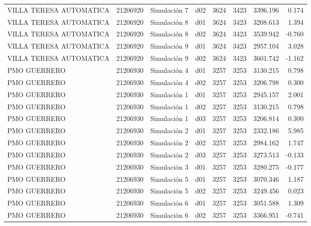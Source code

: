 \begin{landscape}
\begin{longtable}{lrlp{2cm}p{2cm}p{3cm}p{2cm}r}
 VILLA TERESA AUTOMATICA &  21206920 &   Simulación 7 &   d02 &      3624 &     3423 &  3396.196 &     0.174 \\
 VILLA TERESA AUTOMATICA &  21206920 &   Simulación 8 &   d01 &      3624 &     3423 &  3208.613 &     1.394 \\
 VILLA TERESA AUTOMATICA &  21206920 &   Simulación 8 &   d02 &      3624 &     3423 &  3539.942 &    -0.760 \\
 VILLA TERESA AUTOMATICA &  21206920 &   Simulación 9 &   d01 &      3624 &     3423 &  2957.104 &     3.028 \\
 VILLA TERESA AUTOMATICA &  21206920 &   Simulación 9 &   d02 &      3624 &     3423 &  3601.742 &    -1.162 \\
            PMO GUERRERO &  21206930 &   Simulación 4 &   d01 &      3257 &     3253 &  3130.215 &     0.798 \\
            PMO GUERRERO &  21206930 &   Simulación 4 &   d02 &      3257 &     3253 &  3206.798 &     0.300 \\
            PMO GUERRERO &  21206930 &   Simulación 1 &   d01 &      3257 &     3253 &  2945.157 &     2.001 \\
            PMO GUERRERO &  21206930 &   Simulación 1 &   d02 &      3257 &     3253 &  3130.215 &     0.798 \\
            PMO GUERRERO &  21206930 &   Simulación 1 &   d03 &      3257 &     3253 &  3206.814 &     0.300 \\
            PMO GUERRERO &  21206930 &   Simulación 2 &   d01 &      3257 &     3253 &  2332.186 &     5.985 \\
            PMO GUERRERO &  21206930 &   Simulación 2 &   d02 &      3257 &     3253 &  2984.162 &     1.747 \\
            PMO GUERRERO &  21206930 &   Simulación 2 &   d03 &      3257 &     3253 &  3273.513 &    -0.133 \\
            PMO GUERRERO &  21206930 &   Simulación 3 &   d01 &      3257 &     3253 &  3280.275 &    -0.177 \\
            PMO GUERRERO &  21206930 &   Simulación 5 &   d01 &      3257 &     3253 &  3070.346 &     1.187 \\
            PMO GUERRERO &  21206930 &   Simulación 5 &   d02 &      3257 &     3253 &  3249.456 &     0.023 \\
            PMO GUERRERO &  21206930 &   Simulación 6 &   d01 &      3257 &     3253 &  3051.588 &     1.309 \\
            PMO GUERRERO &  21206930 &   Simulación 6 &   d02 &      3257 &     3253 &  3366.951 &    -0.741 \\

\end{longtable}
\end{landscape}
